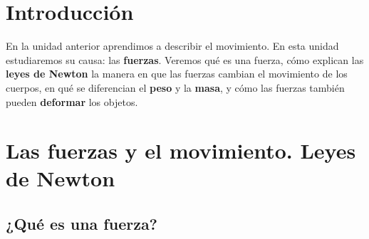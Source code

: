 %
%
%

\raggedbottom %

\section{Introducción}

En la unidad anterior aprendimos a describir el movimiento. En esta unidad estudiaremos su causa: las \textbf{fuerzas}. Veremos qué es una fuerza, cómo explican las \textbf{leyes de Newton} la manera en que las fuerzas cambian el movimiento de los cuerpos, en qué se diferencian el \textbf{peso} y la \textbf{masa}, y cómo las fuerzas también pueden \textbf{deformar} los objetos.

\section{Las fuerzas y el movimiento. Leyes de Newton}

\subsection{¿Qué es una fuerza?}

